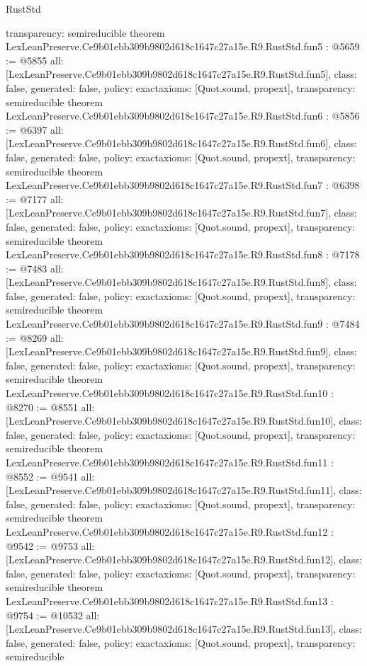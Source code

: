 \begin{lexlean}{RustStd}
\begin{coremodule}
{  transparency: semireducible
}
theorem LexLeanPreserve.Ce9b01ebb309b9802d618c1647c27a15e.R9.RustStd.fun5 : @5659 := @5855 {
  all: [LexLeanPreserve.Ce9b01ebb309b9802d618c1647c27a15e.R9.RustStd.fun5],
  class: false,
  generated: false,
  policy: exact{axioms: [Quot.sound, propext]},
  transparency: semireducible
}
theorem LexLeanPreserve.Ce9b01ebb309b9802d618c1647c27a15e.R9.RustStd.fun6 : @5856 := @6397 {
  all: [LexLeanPreserve.Ce9b01ebb309b9802d618c1647c27a15e.R9.RustStd.fun6],
  class: false,
  generated: false,
  policy: exact{axioms: [Quot.sound, propext]},
  transparency: semireducible
}
theorem LexLeanPreserve.Ce9b01ebb309b9802d618c1647c27a15e.R9.RustStd.fun7 : @6398 := @7177 {
  all: [LexLeanPreserve.Ce9b01ebb309b9802d618c1647c27a15e.R9.RustStd.fun7],
  class: false,
  generated: false,
  policy: exact{axioms: [Quot.sound, propext]},
  transparency: semireducible
}
theorem LexLeanPreserve.Ce9b01ebb309b9802d618c1647c27a15e.R9.RustStd.fun8 : @7178 := @7483 {
  all: [LexLeanPreserve.Ce9b01ebb309b9802d618c1647c27a15e.R9.RustStd.fun8],
  class: false,
  generated: false,
  policy: exact{axioms: [Quot.sound, propext]},
  transparency: semireducible
}
theorem LexLeanPreserve.Ce9b01ebb309b9802d618c1647c27a15e.R9.RustStd.fun9 : @7484 := @8269 {
  all: [LexLeanPreserve.Ce9b01ebb309b9802d618c1647c27a15e.R9.RustStd.fun9],
  class: false,
  generated: false,
  policy: exact{axioms: [Quot.sound, propext]},
  transparency: semireducible
}
theorem LexLeanPreserve.Ce9b01ebb309b9802d618c1647c27a15e.R9.RustStd.fun10 : @8270 := @8551 {
  all: [LexLeanPreserve.Ce9b01ebb309b9802d618c1647c27a15e.R9.RustStd.fun10],
  class: false,
  generated: false,
  policy: exact{axioms: [Quot.sound, propext]},
  transparency: semireducible
}
theorem LexLeanPreserve.Ce9b01ebb309b9802d618c1647c27a15e.R9.RustStd.fun11 : @8552 := @9541 {
  all: [LexLeanPreserve.Ce9b01ebb309b9802d618c1647c27a15e.R9.RustStd.fun11],
  class: false,
  generated: false,
  policy: exact{axioms: [Quot.sound, propext]},
  transparency: semireducible
}
theorem LexLeanPreserve.Ce9b01ebb309b9802d618c1647c27a15e.R9.RustStd.fun12 : @9542 := @9753 {
  all: [LexLeanPreserve.Ce9b01ebb309b9802d618c1647c27a15e.R9.RustStd.fun12],
  class: false,
  generated: false,
  policy: exact{axioms: [Quot.sound, propext]},
  transparency: semireducible
}
theorem LexLeanPreserve.Ce9b01ebb309b9802d618c1647c27a15e.R9.RustStd.fun13 : @9754 := @10532 {
  all: [LexLeanPreserve.Ce9b01ebb309b9802d618c1647c27a15e.R9.RustStd.fun13],
  class: false,
  generated: false,
  policy: exact{axioms: [Quot.sound, propext]},
  transparency: semireducible
}
\end{coremodule}
\end{lexlean}
